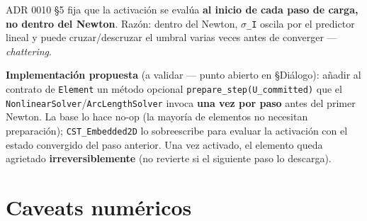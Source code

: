 \documentclass[11pt,letterpaper,oneside]{report}
\begin{document}
ADR 0010 §5 fija que la activación se evalúa \textbf{al inicio de cada paso de carga, no dentro del Newton}. Razón: dentro del Newton, \texttt{\ensuremath{\sigma}\_I} oscila por el predictor lineal y puede cruzar/descruzar el umbral varias veces antes de converger --- \textit{chattering}.

\textbf{Implementación propuesta} (a validar --- punto abierto en §Diálogo): añadir al contrato de \texttt{Element} un método opcional \texttt{prepare\_step(U\_committed)} que el \texttt{NonlinearSolver}/\texttt{ArcLengthSolver} invoca \textbf{una vez por paso} antes del primer Newton. La base lo hace no-op (la mayoría de elementos no necesitan preparación); \texttt{CST\_Embedded2D} lo sobreescribe para evaluar la activación con el estado convergido del paso anterior. Una vez activado, el elemento queda agrietado \textbf{irreversiblemente} (no revierte si el siguiente paso lo descarga).


\section{Caveats numéricos}
\end{document}
